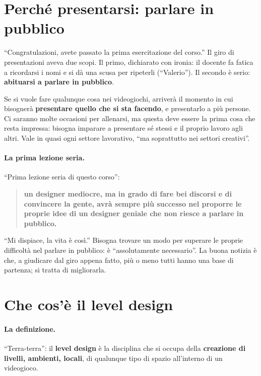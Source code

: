 \section{Perché presentarsi: parlare in pubblico}
\label{gd8:sec:pubblico}

``Congratulazioni, avete passato la prima esercitazione del corso.'' Il giro
di presentazioni aveva due scopi. Il primo, dichiarato con ironia: il
docente fa fatica a ricordarsi i nomi e si dà una scusa per ripeterli (``Valerio'').
Il secondo è serio: \textbf{abituarsi a parlare in pubblico}.

Se si vuole fare qualunque cosa nei videogiochi, arriverà il momento in cui
bisognerà \textbf{presentare quello che si sta facendo}, e presentarlo a più
persone. Ci saranno molte occasioni per allenarsi, ma questa deve essere la
prima cosa che resta impressa: bisogna imparare a presentare sé stessi e il
proprio lavoro agli altri. Vale in quasi ogni settore lavorativo, ``ma
soprattutto nei settori creativi''.

\paragraph{La prima lezione seria.} ``Prima lezione seria di questo corso'':
\begin{quote}
\textbf{un designer mediocre, ma in grado di fare bei discorsi e di convincere
la gente, avrà sempre più successo nel proporre le proprie idee di un designer
geniale che non riesce a parlare in pubblico.}
\end{quote}
``Mi dispiace, la vita è così.'' Bisogna trovare un modo per superare le
proprie difficoltà nel parlare in pubblico: è ``assolutamente necessario''.
La buona notizia è che, a giudicare dal giro appena fatto, più o meno tutti
hanno una base di partenza; si tratta di migliorarla.

\section{Che cos'è il level design}
\label{gd8:sec:cos-e}



\paragraph{La definizione.} ``Terra-terra'': il \textbf{level design} è la
disciplina che si occupa della \textbf{creazione di livelli, ambienti,
locali}, di qualunque tipo di spazio all'interno di un videogioco.

